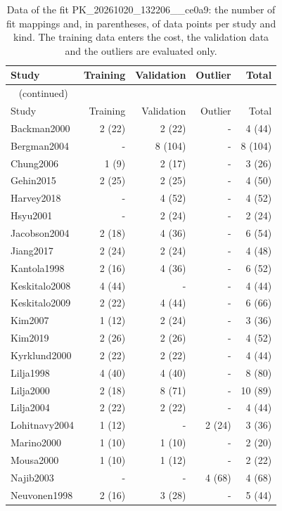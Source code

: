 \begin{longtable}{lrrrr}
\caption{Data of the fit PK\_20261020\_132206\_\_ce0a9: the number of fit mappings and, in parentheses, of data points per study and kind. The training data enters the cost, the validation data and the outliers are evaluated only.}\label{tab:data:PK_20261020_132206__ce0a9} \\
\toprule
Study & Training & Validation & Outlier & Total \\
\midrule
\endfirsthead
\multicolumn{5}{l}{\small\tablename~\thetable{} (continued)} \\
\toprule
Study & Training & Validation & Outlier & Total \\
\midrule
\endhead
\bottomrule
\endlastfoot
Backman2000 & 2 (22) & 2 (22) & - & 4 (44) \\
Bergman2004 & - & 8 (104) & - & 8 (104) \\
Chung2006 & 1 (9) & 2 (17) & - & 3 (26) \\
Gehin2015 & 2 (25) & 2 (25) & - & 4 (50) \\
Harvey2018 & - & 4 (52) & - & 4 (52) \\
Hsyu2001 & - & 2 (24) & - & 2 (24) \\
Jacobson2004 & 2 (18) & 4 (36) & - & 6 (54) \\
Jiang2017 & 2 (24) & 2 (24) & - & 4 (48) \\
Kantola1998 & 2 (16) & 4 (36) & - & 6 (52) \\
Keskitalo2008 & 4 (44) & - & - & 4 (44) \\
Keskitalo2009 & 2 (22) & 4 (44) & - & 6 (66) \\
Kim2007 & 1 (12) & 2 (24) & - & 3 (36) \\
Kim2019 & 2 (26) & 2 (26) & - & 4 (52) \\
Kyrklund2000 & 2 (22) & 2 (22) & - & 4 (44) \\
Lilja1998 & 4 (40) & 4 (40) & - & 8 (80) \\
Lilja2000 & 2 (18) & 8 (71) & - & 10 (89) \\
Lilja2004 & 2 (22) & 2 (22) & - & 4 (44) \\
Lohitnavy2004 & 1 (12) & - & 2 (24) & 3 (36) \\
Marino2000 & 1 (10) & 1 (10) & - & 2 (20) \\
Mousa2000 & 1 (10) & 1 (12) & - & 2 (22) \\
Najib2003 & - & - & 4 (68) & 4 (68) \\
Neuvonen1998 & 2 (16) & 3 (28) & - & 5 (44) \\

\end{longtable}
